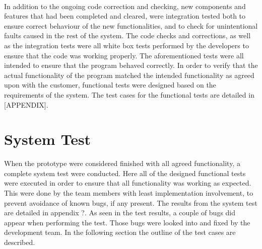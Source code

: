 \paragraph{} In addition to the ongoing code correction and checking, new components and features that had been completed and cleared, were integration tested both to ensure correct behaviour of the new functionalities, and to check for unintentional faults caused in the rest of the system. The code checks and corrections, as well as the integration tests were all white box tests performed by the developers to ensure that the code was working properly. The aforementioned tests were all intended to ensure that the program behaved correctly. In order to verify that the actual functionality of the program matched the intended functionality as agreed upon with the customer, functional tests were designed based on the requirements of the system. The test cases for the functional tests are detailed in [APPENDIX]. %

\section{System Test}
\label{sec:TestingSystem}

When the prototype were considered finished with all agreed functionality, a complete system test were conducted. Here all of the designed functional tests were executed  in order to ensure that all functionality was working as expected. This were done by the team members with least implementation involvement, to prevent avoidance of known bugs, if any present. The results from the system test are detailed in appendix ?. As seen in the test results, a couple of bugs did appear when performing the test. Those bugs were looked into and fixed by the development team. In the following section the outline of the test cases are described.

